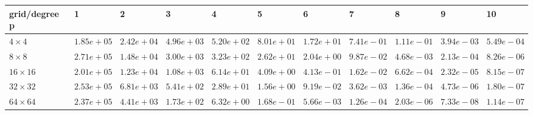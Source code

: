 \begin{tabular}{lllllllllll}
\hline
 grid/degree p   & 1          & 2          & 3          & 4          & 5          & 6          & 7          & 8          & 9          & 10         \\
\hline
 $4 \times 4$    & $1.85e+05$ & $2.42e+04$ & $4.96e+03$ & $5.20e+02$ & $8.01e+01$ & $1.72e+01$ & $7.41e-01$ & $1.11e-01$ & $3.94e-03$ & $5.49e-04$ \\
 $8 \times 8$    & $2.71e+05$ & $1.48e+04$ & $3.00e+03$ & $3.23e+02$ & $2.62e+01$ & $2.04e+00$ & $9.87e-02$ & $4.68e-03$ & $2.13e-04$ & $8.26e-06$ \\
 $16 \times 16$  & $2.01e+05$ & $1.23e+04$ & $1.08e+03$ & $6.14e+01$ & $4.09e+00$ & $4.13e-01$ & $1.62e-02$ & $6.62e-04$ & $2.32e-05$ & $8.15e-07$ \\
 $32 \times 32$  & $2.53e+05$ & $6.81e+03$ & $5.41e+02$ & $2.89e+01$ & $1.56e+00$ & $9.19e-02$ & $3.62e-03$ & $1.36e-04$ & $4.73e-06$ & $1.80e-07$ \\
 $64 \times 64$  & $2.37e+05$ & $4.41e+03$ & $1.73e+02$ & $6.32e+00$ & $1.68e-01$ & $5.66e-03$ & $1.26e-04$ & $2.03e-06$ & $7.33e-08$ & $1.14e-07$ \\
\hline
\end{tabular}